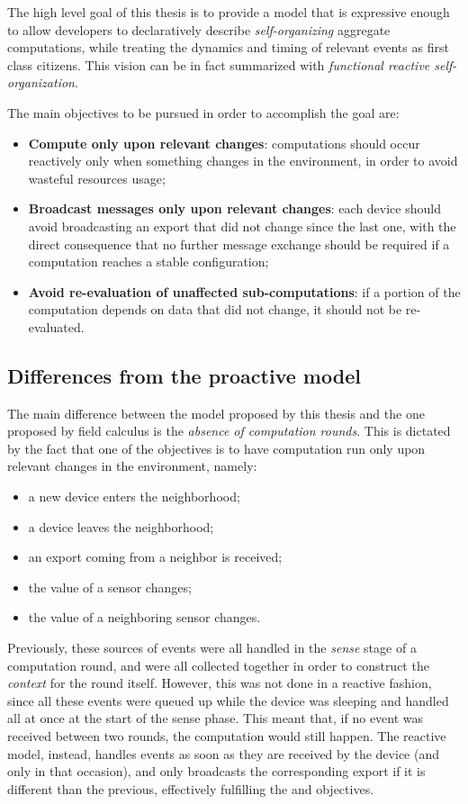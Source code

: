 The high level goal of this thesis is to provide a model that is expressive enough to allow developers to declaratively describe \textit{self-organizing} aggregate computations, while treating the dynamics and timing of relevant events as first class citizens.
%
This vision can be in fact summarized with \textit{functional reactive self-organization}.

The main objectives to be pursued in order to accomplish the goal are:
%
\begin{itemize}
    \item \textbf{Compute only upon relevant changes}: computations should occur reactively only when something changes in the environment, in order to avoid wasteful resources usage;
    \item \textbf{Broadcast messages only upon relevant changes}: each device should avoid broadcasting an export that did not change since the last one, with the direct consequence that no further message exchange should be required if a computation reaches a stable configuration;
    \item \textbf{Avoid re-evaluation of unaffected sub-computations}: if a portion of the computation depends on data that did not change, it should not be re-evaluated.
\end{itemize}

\subsection{Differences from the proactive model}

The main difference between the model proposed by this thesis and the one proposed by field calculus is the \textit{absence of computation rounds}.
%
This is dictated by the fact that one of the objectives is to have computation run only upon relevant changes in the environment, namely:
%
\begin{itemize}
    \item a new device enters the neighborhood;
    \item a device leaves the neighborhood;
    \item an export coming from a neighbor is received;
    \item the value of a sensor changes;
    \item the value of a neighboring sensor changes.
\end{itemize}
%
Previously, these sources of events were all handled in the \textit{sense} stage of a computation round, and were all collected together in order to construct the \textit{context} for the round itself.
%
However, this was not done in a reactive fashion, since all these events were queued up while the device was sleeping and handled all at once at the start of the sense phase.
%
This meant that, if no event was received between two rounds, the computation would still happen.
%
The reactive model, instead, handles events as soon as they are received by the device (and only in that occasion), and only broadcasts the corresponding export if it is different than the previous, effectively fulfilling the  and  objectives.

